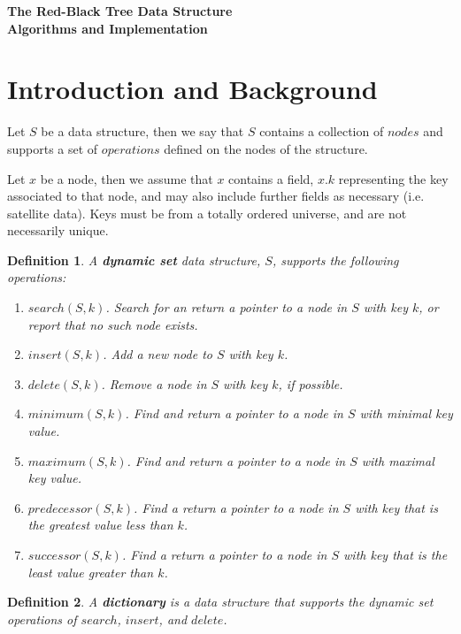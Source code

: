 \documentclass[10pt]{article}
\newtheorem{definition}{Definition}[section]
\begin{document}
\begin{center}
  \textbf{The Red-Black Tree Data Structure} \\
  \textbf{Algorithms and Implementation}
\end{center}

\section{Introduction and Background}

Let $S$ be a data structure, then we say that $S$ contains a collection
of $nodes$ and supports a set of $operations$ defined on the nodes of the
structure.

Let $x$ be a node, then we assume that $x$ contains a field, $x.k$
representing the key associated to that node, and may also include further
fields as necessary (i.e. satellite data). Keys must be from a totally
ordered universe, and are not necessarily unique.

\begin{definition}
A \textbf{dynamic set} data structure, $S$, supports the following operations:
\begin{enumerate}
    \setlength\itemsep{1em}
    \item $search(S, k)$. Search for an return a pointer to a node in $S$ with
      key $k$, or report that no such node exists.
    \item $insert(S, k)$. Add a new node to $S$ with key $k$.
    \item $delete(S, k)$. Remove a node in $S$ with key $k$, if possible.
    \item $minimum(S, k)$. Find and return a pointer to a node in $S$
      with minimal key value.
    \item $maximum(S,k)$. Find and return a pointer to a node in $S$ with
      maximal key value.
    \item $predecessor(S, k)$. Find a return a pointer to a node in $S$ with
      key that is the greatest value less than $k$.
    \item $successor(S, k)$. Find a return a pointer to a node in $S$ with
      key that is the least value greater than $k$.
\end{enumerate}
\end{definition}

\begin{definition}
  A \textbf{dictionary} is a data structure that supports the dynamic set
  operations of $search$, $insert$, and $delete$.
\end{definition}
\end{document}
